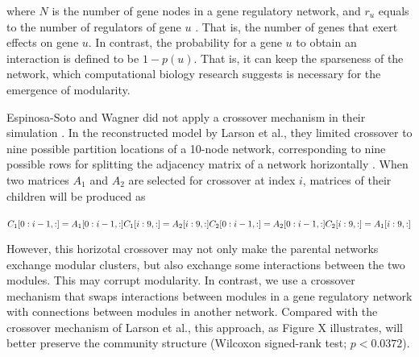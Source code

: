 where $N$ is the number of gene nodes in a gene regulatory network, and $r_{u}$ equals to the number of regulators of gene $u$ \cite{espinosa2010specialization}. That is, the number of genes that exert effects on gene $u$. In contrast, the probability for a gene $u$ to obtain an interaction is defined to be $1-p(u)$. That is, it can keep the sparseness of the network, which computational biology research suggests is necessary for the emergence of modularity. 

Espinosa-Soto and Wagner did not apply a crossover mechanism in their simulation \cite{espinosa2010specialization}. In the reconstructed model by Larson et al., they limited crossover to nine possible partition locations of a 10-node network, corresponding to nine possible rows for splitting the adjacency matrix of a network horizontally \cite{larson2016recombination}. When two matrices $A_{1}$ and $A_{2}$ are selected for crossover at index $i$, matrices of their children will be produced as \\ \\
$C_{1}[0: i-1, :] = A_{1}[0: i-1, :]\\
C_{1}[i: 9, :] = A_{2}[i: 9, :]\\
C_{2}[0: i-1, :] = A_{2}[0: i-1, :]\\
C_{2}[i: 9, :] = A_{1}[i: 9, :]\\$

However, this horizotal crossover may not only make the parental networks exchange modular clusters, but also exchange some interactions between the two modules. This may corrupt modularity. In contrast, we use a crossover mechanism that swaps interactions between modules in a gene regulatory network with connections between modules in another network. Compared with the crossover mechanism of Larson et al., this approach, as Figure X illustrates, will better preserve the community structure (Wilcoxon signed-rank test; $p<0.0372$). 

